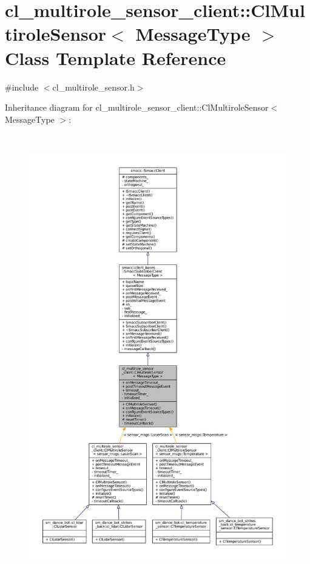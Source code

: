 \hypertarget{classcl__multirole__sensor__client_1_1ClMultiroleSensor}{}\section{cl\+\_\+multirole\+\_\+sensor\+\_\+client\+:\+:Cl\+Multirole\+Sensor$<$ Message\+Type $>$ Class Template Reference}
\label{classcl__multirole__sensor__client_1_1ClMultiroleSensor}


{\ttfamily \#include $<$cl\+\_\+multirole\+\_\+sensor.\+h$>$}



Inheritance diagram for cl\+\_\+multirole\+\_\+sensor\+\_\+client\+:\+:Cl\+Multirole\+Sensor$<$ Message\+Type $>$\+:
\nopagebreak
\begin{figure}[H]
\begin{center}
\leavevmode
\includegraphics[height=550pt]{classcl__multirole__sensor__client_1_1ClMultiroleSensor__inherit__graph}
\end{center}
\end{figure}


